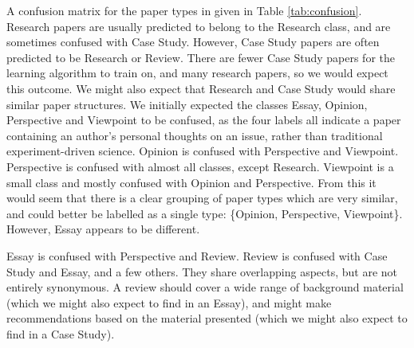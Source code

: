 \documentclass{svmult}
\begin{document}
A confusion matrix for the paper types in given in Table \ref{tab:confusion}. Research papers are usually predicted to belong to the Research class, and are sometimes confused with Case Study. However, Case Study papers are often predicted to be Research or Review. There are fewer Case Study papers for the learning algorithm to train on, and many research papers, so we would expect this outcome. We might also expect that Research and Case Study would share similar paper structures. 
We initially expected the classes Essay, Opinion, Perspective and Viewpoint to be confused, as the four labels all indicate a paper containing an author's personal thoughts on an issue, rather than traditional experiment-driven science. Opinion is confused with Perspective and Viewpoint. Perspective is confused with almost all classes, except Research. Viewpoint is a small class and mostly confused with Opinion and Perspective. From this it would seem that there is a clear grouping of paper types which are very similar, and could better be labelled as a single type: \{Opinion, Perspective, Viewpoint\}. However, Essay appears to be different.

Essay is confused with Perspective and Review. Review is confused with Case Study and Essay, and a few others. They share overlapping aspects, but are not entirely synonymous. A review should cover a wide range of background material (which we might also expect to find in an Essay), and might make recommendations based on the material presented (which we might also expect to find in a Case Study). 
\end{document}
